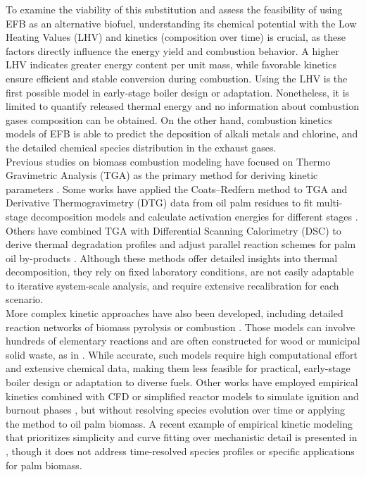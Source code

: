 \documentclass[preprint,12pt]{elsarticle}
\begin{document}
To examine the viability of this substitution and assess the feasibility of using EFB as an alternative biofuel, understanding its chemical potential with the Low Heating Values (LHV) and kinetics (composition over time) is crucial, as these factors directly influence the energy yield and combustion behavior. A higher LHV indicates greater energy content per unit mass, while favorable kinetics ensure efficient and stable conversion during combustion. Using the LHV is the first possible model in early-stage boiler design or adaptation. Nonetheless, it is limited to quantify released thermal energy and no information about combustion gases composition can be obtained. On the other hand, combustion kinetics models of EFB is able to predict the deposition of alkali metals and chlorine, and the detailed chemical species distribution in the exhaust gases. \\%

Previous studies on biomass combustion modeling have focused on Thermo Gravimetric Analysis (TGA) as the primary method for deriving kinetic parameters \cite{Khan2023}. Some works have applied the Coats–Redfern method to TGA and Derivative Thermogravimetry (DTG) data from oil palm residues to fit multi-stage decomposition models and calculate activation energies for different stages \cite{Ninduangdee2015, Jia2021}. Others have combined TGA with Differential Scanning Calorimetry (DSC) to derive thermal degradation profiles and adjust parallel reaction schemes for palm oil by-products \cite{GarciaNunez2006}. Although these methods offer detailed insights into thermal decomposition, they rely on fixed laboratory conditions, are not easily adaptable to iterative system-scale analysis, and require extensive recalibration for each scenario.\\

More complex kinetic approaches have also been developed, including detailed reaction networks of biomass pyrolysis or combustion \cite{Dhahak2021, Ranzi2013}. Those models can involve hundreds of elementary reactions and are often constructed for wood or municipal solid waste, as in \cite{Luo2019, Frank2014}. While accurate, such models require high computational effort and extensive chemical data, making them less feasible for practical, early-stage boiler design or adaptation to diverse fuels. Other works have employed empirical kinetics combined with CFD or simplified reactor models to simulate ignition and burnout phases \cite{Silva2023, Navarrete2017}, but without resolving species evolution over time or applying the method to oil palm biomass. A recent example of empirical kinetic modeling that prioritizes simplicity and curve fitting over mechanistic detail is presented in \cite{Varhegyi2020}, though it does not address time-resolved species profiles or specific applications for palm biomass.\\
\end{document}
